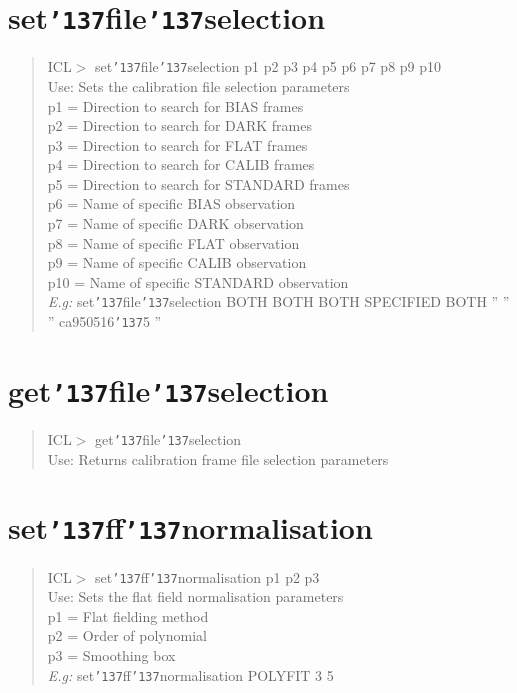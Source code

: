 \documentclass[a4paper]{book}
\renewcommand{\_}{{\tt\char'137}}
\begin{document}
\section{set\_file\_selection}
\begin{quote}
ICL$>$ set\_file\_selection p1 p2 p3 p4 p5 p6 p7 p8 p9 p10 \\
Use: Sets the calibration file selection parameters \\
p1 = Direction to search for BIAS frames \\ 
p2 = Direction to search for DARK frames \\ 
p3 = Direction to search for FLAT frames \\ 
p4 = Direction to search for CALIB frames \\ 
p5 = Direction to search for STANDARD frames \\ 
p6 = Name of specific BIAS observation \\
p7 = Name of specific DARK observation \\
p8 = Name of specific FLAT observation \\
p9 = Name of specific CALIB observation \\
p10 = Name of specific STANDARD observation \\
{\em E.g:} set\_file\_selection BOTH BOTH BOTH SPECIFIED BOTH '' '' '' ca950516\_5 ''
\end{quote}

\section{get\_file\_selection}
\begin{quote}
ICL$>$ get\_file\_selection \\
Use: Returns calibration frame file selection parameters
\end{quote}

\section{set\_ff\_normalisation}
\begin{quote}
ICL$>$ set\_ff\_normalisation p1 p2 p3 \\
Use: Sets the flat field normalisation parameters \\
p1 = Flat fielding method \\
p2 = Order of polynomial \\
p3 = Smoothing box \\
{\em E.g:} set\_ff\_normalisation POLYFIT 3 5
\end{quote}
\end{document}
